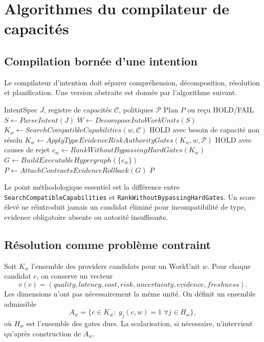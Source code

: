\chapter{Algorithmes du compilateur de capacités}

\section{Compilation bornée d'une intention}

Le compilateur d'intention doit séparer compréhension, décomposition, résolution et planification. Une version abstraite est donnée par l'algorithme suivant.

\begin{algorithm}
\caption{Intent-to-RepoGraph borné}
\begin{algorithmic}[1]
\Require IntentSpec $J$, registre de capacités $\mathcal C$, politiques $\mathcal P$
\Ensure Plan $P$ ou reçu HOLD/FAIL
\State $S\gets ParseIntent(J)$
\State $W\gets DecomposeIntoWorkUnits(S)$
  \State $K_w\gets SearchCompatibleCapabilities(w,\mathcal C)$
    \State \Return HOLD avec besoin de capacité non résolu
  \EndIf
  \State $K_w\gets ApplyTypeEvidenceRiskAuthorityGates(K_w,w,\mathcal P)$
    \State \Return HOLD avec causes de rejet
  \EndIf
  \State $c_w\gets RankWithoutBypassingHardGates(K_w)$
\EndFor
\State $G\gets BuildExecutableHypergraph(\{c_w\})$
\State $P\gets AttachContractsEvidenceRollback(G)$
\State \Return $P$
\end{algorithmic}
\end{algorithm}

Le point méthodologique essentiel est la différence entre \texttt{SearchCompatibleCapabilities} et \texttt{RankWithoutBypassingHardGates}. Un score élevé ne réintroduit jamais un candidat éliminé pour incompatibilité de type, evidence obligatoire absente ou autorité insuffisante.

\section{Résolution comme problème contraint}

Soit $K_w$ l'ensemble des providers candidats pour un WorkUnit $w$. Pour chaque candidat $c$, on conserve un vecteur
\[
v(c)=(quality,latency,cost,risk,uncertainty,evidence,freshness).
\]
Les dimensions n'ont pas nécessairement la même unité. On définit un ensemble admissible
\[
A_w=\{c\in K_w:\;g_j(c,w)=1\;\forall j\in H_w\},
\]
où $H_w$ est l'ensemble des gates durs. La scalarisation, si nécessaire, n'intervient qu'après construction de $A_w$.

